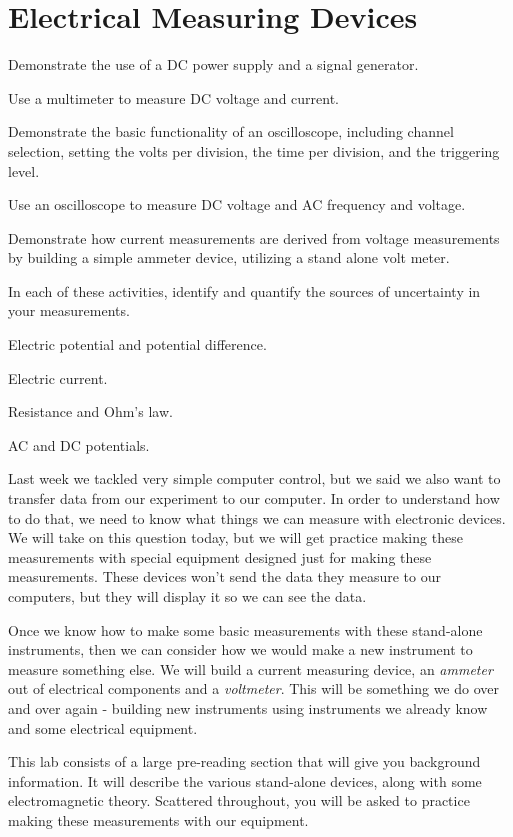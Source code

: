 \chapter{Electrical Measuring Devices}

\objectives
{
\item Demonstrate the use of a DC power supply and a signal generator.
\item Use a multimeter to measure DC voltage and current.
\item Demonstrate the basic functionality of an oscilloscope, including
channel selection, setting the volts per division, the time per division, and
the triggering level.
\item Use an oscilloscope to measure DC voltage and AC frequency and voltage.
\item Demonstrate how current measurements are derived from voltage 
measurements by building a simple ammeter device, utilizing a stand alone
volt meter.
\item In each of these activities, identify and quantify the sources of
uncertainty in your measurements.
}

\review
{
\item Electric potential and potential difference.
\item Electric current.
\item Resistance and Ohm's law.
\item AC and DC potentials.
}

Last week we tackled very simple computer control, but we said we also want
to transfer data from our experiment to our computer. In order to understand
how to do that, we need to know what things we can measure with electronic
devices. We will take on this question today, but we will get practice
making these measurements with special equipment designed just for making
these measurements. These devices won't send the data they measure to our
computers, but they will display it so we can see the data.

Once we know how to make some basic measurements with these stand-alone
instruments, then we can consider how we would make a new instrument to
measure something else. We will build a current measuring device, an \emph{%
ammeter} out of electrical components and a \emph{voltmeter}. This will be
something we do over and over again - building new instruments using
instruments we already know and some electrical equipment.

This lab consists of a large pre-reading section that will give you
background information. It will describe the various stand-alone devices, along
with some electromagnetic theory. Scattered throughout, you will be asked to 
practice making these measurements with our equipment. 

